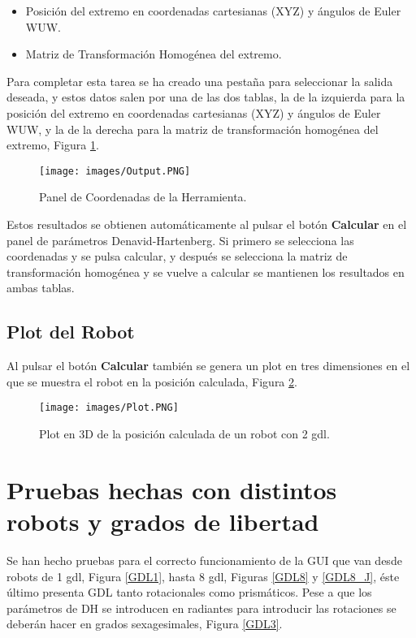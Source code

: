 \documentclass[a4paper, fontsize=11pt]{scrartcl} %
\numberwithin{equation}{section} %
\numberwithin{figure}{section} %
\numberwithin{table}{section} %
\begin{document}
	\begin{itemize}
		\item Posición del extremo en coordenadas cartesianas (XYZ) y ángulos de Euler WUW.
		\item Matriz de Transformación Homogénea del extremo.
	\end{itemize}
	
	Para completar esta tarea se ha creado una pestaña para seleccionar la salida deseada, y estos datos salen por una de las dos tablas, la de la izquierda para la posición del extremo en coordenadas cartesianas (XYZ) y ángulos de Euler WUW, y la de la derecha para la matriz de transformación homogénea del extremo, Figura \ref{Output}.\\
	
	\begin{figure}[h!]
		\centering
		\texttt{[image: images/Output.PNG]}
		\caption{Panel de Coordenadas de la Herramienta.}
		\label{Output}
	\end{figure}
	\FloatBarrier
	
	Estos resultados se obtienen automáticamente al pulsar el botón \textbf{Calcular} en el panel de parámetros Denavid-Hartenberg. Si primero se selecciona las coordenadas y se pulsa calcular, y después se selecciona la matriz de transformación homogénea y se vuelve a calcular se mantienen los resultados en ambas tablas.\\
	
	\subsection{Plot del Robot}
	
	Al pulsar el botón \textbf{Calcular} también se genera un plot en tres dimensiones en el que se muestra el robot en la posición calculada, Figura \ref{Plot}.
	
	\begin{figure}[h!]
		\centering
		\texttt{[image: images/Plot.PNG]}
		\caption{Plot en 3D de la posición calculada de un robot con 2 gdl.}
		\label{Plot}
	\end{figure}
	\FloatBarrier
	
	\section{Pruebas hechas con distintos robots y grados de libertad}
	
	Se han hecho pruebas para el correcto funcionamiento de la GUI que van desde robots de 1 gdl, Figura \ref{GDL1}, hasta 8 gdl, Figuras \ref{GDL8} y \ref{GDL8_J}, éste último presenta GDL tanto rotacionales como prismáticos. Pese a que los parámetros de DH se introducen en radiantes para introducir las rotaciones se deberán hacer en grados sexagesimales, Figura \ref{GDL3}.
	
\end{document}

